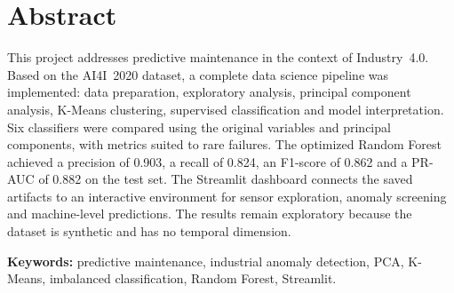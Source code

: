 \documentclass[12pt,a4paper]{article}
\begin{document}
\begin{abstract}
Ce projet porte sur la maintenance prédictive dans le contexte de l'Industrie~4.0. À partir du jeu de données AI4I~2020 (10\,000 observations de machines industrielles), nous construisons un pipeline complet de Machine Learning : prétraitement, analyse exploratoire, réduction de dimension par PCA, regroupement par K-Means, puis classification supervisée avec six algorithmes (régression logistique, KNN, SVM, arbre de décision, Random Forest et Gradient Boosting). Les modèles sont comparés avec les variables originales et avec les composantes principales, à l'aide de métriques adaptées au déséquilibre des classes (Recall, F1-score, PR-AUC). Le Random Forest optimisé atteint sur le test une précision de 0,903, un recall de 0,824, un F1-score de 0,862 et une PR-AUC de 0,882. Les variables mécaniques, thermiques et liées à l'usure expliquent l'essentiel du signal prédictif, tandis que la PCA dégrade les performances de classification.

\medskip
\textbf{Mots-clés :} maintenance prédictive, détection d'anomalies, PCA, K-Means, classification, déséquilibre de classes, Random Forest.
\end{abstract}

\section*{Abstract}
This project addresses predictive maintenance in the context of Industry~4.0. Based on the AI4I~2020 dataset, a complete data science pipeline was implemented: data preparation, exploratory analysis, principal component analysis, K-Means clustering, supervised classification and model interpretation. Six classifiers were compared using the original variables and principal components, with metrics suited to rare failures. The optimized Random Forest achieved a precision of 0.903, a recall of 0.824, an F1-score of 0.862 and a PR-AUC of 0.882 on the test set. The Streamlit dashboard connects the saved artifacts to an interactive environment for sensor exploration, anomaly screening and machine-level predictions. The results remain exploratory because the dataset is synthetic and has no temporal dimension.

\medskip
\textbf{Keywords:} predictive maintenance, industrial anomaly detection, PCA, K-Means, imbalanced classification, Random Forest, Streamlit.

\tableofcontents
\listoffigures
\listoftables
\end{document}
